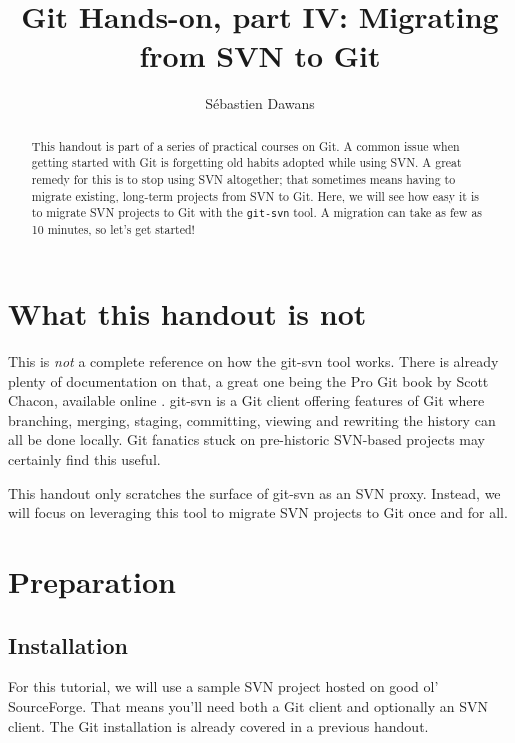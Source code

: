 \documentclass{../common/tufte-latex/tufte-handout}
\title{Git Hands-on, part IV: Migrating from SVN to Git}
\author{S\'ebastien Dawans}
\begin{document}
\maketitle%

\begin{abstract}
\noindent
This handout is part of a series of practical courses on Git.
A common issue when getting started with Git is forgetting old habits adopted while using SVN.
A great remedy for this is to stop using SVN altogether; that sometimes means having to migrate existing, long-term projects from SVN to Git.
Here, we will see how easy it is to migrate SVN projects to Git with the \texttt{git-svn} tool.
A migration can take as few as 10 minutes, so let's get started!
\end{abstract}

\section{What this handout is not}

This is \textit{not} a complete reference on how the git-svn tool works.
There is already plenty of documentation on that, a great one being the Pro Git book by Scott Chacon, available online \cite{git-scm-ch8}.
git-svn is a Git client offering features of Git where branching, merging, staging, committing, viewing and rewriting the history can all be done locally.
Git fanatics stuck on pre-historic SVN-based projects may certainly find this useful.

This handout only scratches the surface of git-svn as an SVN proxy.
Instead, we will focus on leveraging this tool to migrate SVN projects to Git once and for all.

\section{Preparation}

\subsection{Installation}

For this tutorial, we will use a sample SVN project hosted on good ol' SourceForge. 
That means you'll need both a Git client and optionally an SVN client.
The Git installation is already covered in a previous handout.
\end{document}
